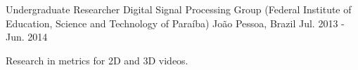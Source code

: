 \begin{cventries}
  \cventry
    {Undergraduate Researcher} %
    {Digital Signal Processing Group (Federal Institute of Education, Science and Technology of Paraíba)} %
    {João Pessoa, Brazil} %
    {Jul. 2013 - Jun. 2014} %
    {
      \begin{cvitems} %
	    \item {Research in metrics for 2D and 3D videos.}
      \end{cvitems}
    }


\end{cventries}
